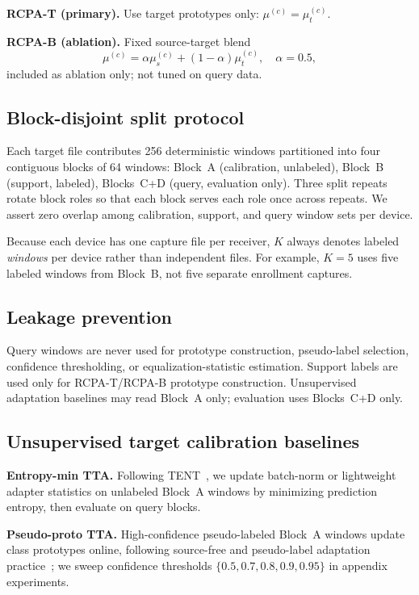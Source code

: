 \textbf{RCPA-T (primary).}
Use target prototypes only: $\mu^{(c)}=\mu_t^{(c)}$.

\textbf{RCPA-B (ablation).}
Fixed source-target blend
\begin{equation}
\mu^{(c)}=\alpha\mu_s^{(c)}+(1-\alpha)\mu_t^{(c)}, \quad \alpha=0.5,
\end{equation}
included as ablation only; not tuned on query data.

\subsection{Block-disjoint split protocol}
Each target file contributes 256 deterministic windows partitioned into four contiguous blocks of 64 windows:
Block~A (calibration, unlabeled), Block~B (support, labeled), Blocks~C+D (query, evaluation only).
Three split repeats rotate block roles so that each block serves each role once across repeats.
We assert zero overlap among calibration, support, and query window sets per device.

Because each device has one capture file per receiver, $K$ always denotes labeled \emph{windows} per device rather than independent files.
For example, $K=5$ uses five labeled windows from Block~B, not five separate enrollment captures.

\subsection{Leakage prevention}
Query windows are never used for prototype construction, pseudo-label selection, confidence thresholding, or equalization-statistic estimation.
Support labels are used only for RCPA-T/RCPA-B prototype construction.
Unsupervised adaptation baselines may read Block~A only; evaluation uses Blocks~C+D only.

\subsection{Unsupervised target calibration baselines}
\textbf{Entropy-min TTA.}
Following TENT~\cite{wang2021tent}, we update batch-norm or lightweight adapter statistics on unlabeled Block~A windows by minimizing prediction entropy, then evaluate on query blocks.

\textbf{Pseudo-proto TTA.}
High-confidence pseudo-labeled Block~A windows update class prototypes online, following source-free and pseudo-label adaptation practice~\cite{liang2020shot,yang2025scrffi}; we sweep confidence thresholds $\{0.5,0.7,0.8,0.9,0.95\}$ in appendix experiments.

